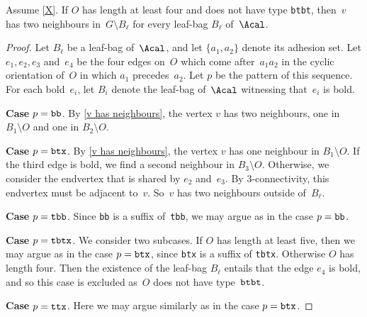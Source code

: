 \documentclass{aic}
\theoremstyle{plain}
\theoremstyle{definition}
\theoremstyle{plain}
\theoremstyle{plain}
\newcommand{\sm}{\setminus}
\newcommand{\ty}[1]{{\tt#1}}
\begin{document}
\begin{lem}\label{make_nice}
Assume \autoref{X}.
If $O$ has length at least four and does not have type \ty{btbt}, then~$v$ has two neighbours in~$G\sm B_\ell$ for every leaf-bag $B_\ell$ of~$\Acal$.
\end{lem}
\begin{proof}
Let $B_\ell$ be a leaf-bag of~$\Acal$, and let $\{a_1,a_2\}$ denote its adhesion set.
Let $e_1,e_2,e_3$ and~$e_4$ be the four edges on~$O$ which come after~$a_1a_2$ in the cyclic 
orientation of~$O$ in which $a_1$ precedes~$a_2$. 
Let $p$ be the pattern of this sequence.
For each bold~$e_i$, let $B_i$ denote the leaf-bag of~$\Acal$ witnessing that~$e_i$ is bold.

\textbf{Case} $p=\ty{bb}$. 
By \autoref{v has neighbours}, the vertex $v$ has two neighbours, one in $B_1\sm O$ and one in $B_2\sm O$.

\textbf{Case} $p=\ty{btx}$. 
By \autoref{v has neighbours}, the vertex $v$ has one neighbour in $B_1\sm O$.
If the third edge is bold, we find a second neighbour in $B_3\sm O$.
Otherwise, we consider the endvertex that is shared by $e_2$ and~$e_3$. 
By 3-connectivity, this endvertex must be adjacent to~$v$. 
So~$v$ has two 
neighbours outside of~$B_\ell$. 

\textbf{Case} $p=\ty{tbb}$. Since \ty{bb} is a suffix of~\ty{tbb}, we may argue as in the case $p=\ty{bb}$.

\textbf{Case} $p=\ty{tbtx}$. 
We consider two subcases. 
If $O$ has length at least five, then we may argue as in the case $p=\ty{btx}$, since \ty{btx} is a suffix of \ty{tbtx}.
Otherwise $O$ has length four. 
Then the existence of the leaf-bag $B_\ell$ entails that the edge $e_4$
is bold, and so this case is excluded as~$O$ does not have type~$\ty{btbt}$. 

\textbf{Case} $p=\ty{ttx}$.
Here we may argue similarly as in the case $p=\ty{btx}$.
\end{proof}
\end{document}
